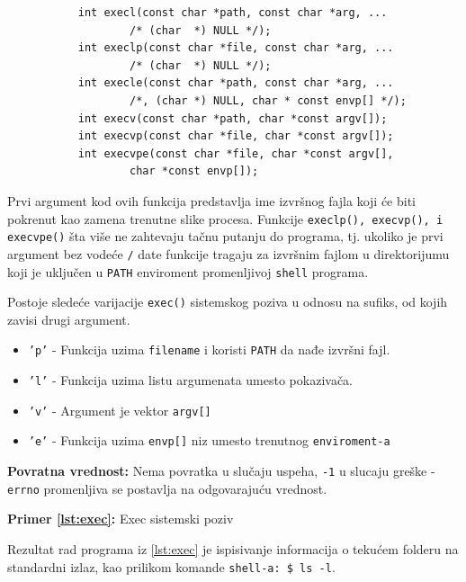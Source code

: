 \documentclass[a4paper, 11pt]{article}
\newcommand{\scode}[3] {
	\hspace{.06\textwidth} 
	\begin{minipage}[t]{.88\textwidth} %
		\begin{mdframed}[topline=true,bottomline=true,leftline=true,rightline=true,backgroundcolor=gray!22, linecolor=gray!60!black,roundcorner=1mm]
			 

	\begin{center}
		\caption{\textbf{Primer \ref{lst:#3}:} #2}
	\end{center}
	\end{mdframed}
	\end{minipage}

}
\begin{document}
\hspace{.15\textwidth} 
\begin{minipage}[t]{.7\textwidth} %
	\begin{verbatim}
	       int execl(const char *path, const char *arg, ...
			       /* (char  *) NULL */);
	       int execlp(const char *file, const char *arg, ...
			       /* (char  *) NULL */);
	       int execle(const char *path, const char *arg, ...
			       /*, (char *) NULL, char * const envp[] */);
	       int execv(const char *path, char *const argv[]);
	       int execvp(const char *file, char *const argv[]);
	       int execvpe(const char *file, char *const argv[],
			       char *const envp[]);
       \end{verbatim}
\end{minipage}

Prvi argument kod ovih funkcija predstavlja ime izvršnog fajla koji će biti pokrenut kao zamena trenutne slike procesa. Funkcije \texttt{execlp(), execvp(), i execvpe()} šta više ne zahtevaju tačnu putanju do programa, tj. ukoliko je prvi argument bez vodeće \texttt{/} date funkcije tragaju za izvršnim fajlom u direktorijumu koji je uključen u \texttt{PATH} enviroment promenljivoj \texttt{shell} programa.
	
Postoje sledeće varijacije \texttt{exec()} sistemskog poziva u odnosu na sufiks, od kojih zavisi drugi argument.

\begin{itemize}[]
	\item{\texttt{'p'} - Funkcija uzima \texttt{filename} i koristi \texttt{PATH} da nađe izvršni fajl.}
	\item{\texttt{'l'} - Funkcija uzima listu argumenata umesto pokazivača.}
	\item{\texttt{'v'} - Argument je vektor \texttt{argv[]}}
	\item{\texttt{'e'} - Funkcija uzima \texttt{envp[]} niz umesto trenutnog \texttt{enviroment-a}}
\end{itemize}

\textbf{Povratna vrednost:} Nema povratka u slučaju uspeha, \texttt{-1} u slucaju greške - \texttt{errno} promenljiva se postavlja na odgovarajuću vrednost.

\vspace{-1mm} 
\scode{exec.c}{Exec sistemski poziv}{exec}

\vspace{2mm} 
Rezultat rad programa iz \ref{lst:exec} je ispisivanje informacija o tekućem folderu na standardni izlaz, kao prilikom komande \texttt{shell-a: \$ ls -l}.
\end{document}
